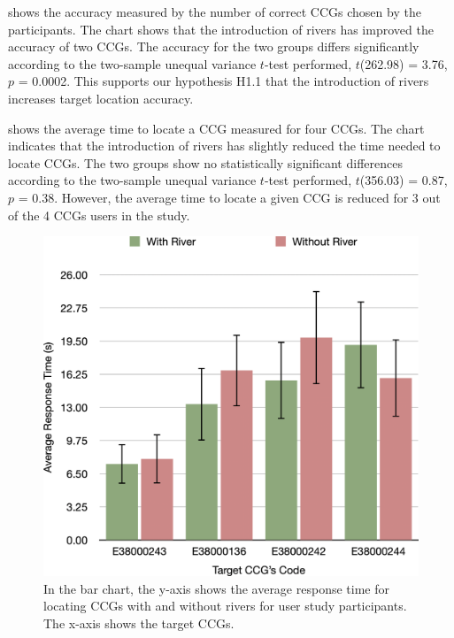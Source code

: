   shows the accuracy measured by the number of correct CCGs chosen by the participants. The chart shows that the introduction of rivers has improved the accuracy of two CCGs. The accuracy for the two groups differs significantly according to the two-sample unequal variance $t$-test performed, $t$(262.98) = 3.76, $p$ = 0.0002. This supports our hypothesis H1.1 that the introduction of rivers increases target location accuracy.


  shows the average time to locate a CCG measured for four CCGs. The chart indicates that the introduction of rivers has slightly reduced the time needed to locate CCGs. The two groups show no statistically significant differences according to the two-sample unequal variance $t$-test performed, $t$(356.03) = 0.87, $p$ = 0.38. However, the average time to locate a given CCG is reduced for 3 out of the 4 CCGs users in the study.

    {
        \begin{figure}[t!]
            \centering
            \includegraphics[width=\columnwidth,keepaspectratio]{figure/evaluation/rt.png}
            \caption{In the bar chart, the y-axis shows the average response time for locating CCGs with and without rivers for user study participants. The x-axis shows the target CCGs.}
            \label{fig:task-rt}
        \end{figure}
    }

